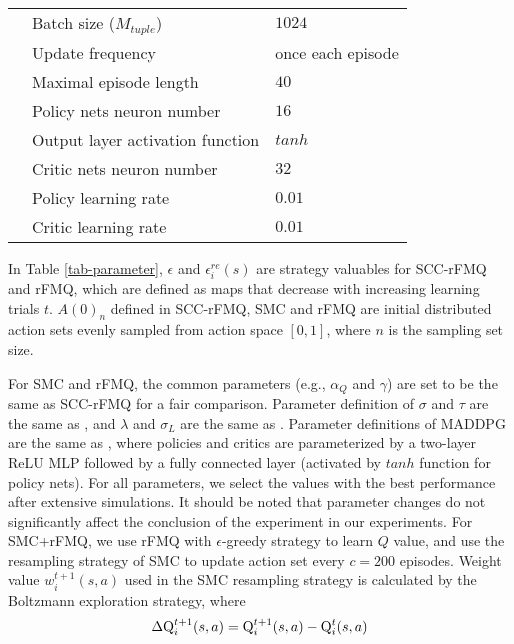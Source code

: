 \documentclass[journal,transmag]{IEEEtran}
\begin{document}
\begin{table}[h!]
\begin{tabular}{l|l|l}
                        &  Batch size ($M_{tuple}$)              &  $1024$    \\
                        &  Update frequency                     &  once each episode \\
                        &  Maximal episode length                &  $40$       \\
                        &  Policy nets neuron number             &  $16$       \\
                        &  Output layer activation function      &  $tanh$       \\
                        &  Critic nets neuron number             &  $32$       \\
                        &  Policy learning rate                  &  $0.01$       \\
                        &  Critic learning rate                  &  $0.01$       \\
\hline
\hline
\end{tabular}
\end{table}

In Table \ref{tab-parameter}, $\epsilon$ and $\epsilon_i^{re}(s)$ are strategy valuables for SCC-rFMQ and rFMQ, which are defined as maps that decrease with increasing learning trials $t$. $A(0)_n$  defined in SCC-rFMQ, SMC and rFMQ are initial distributed action sets evenly sampled from action space $[0,1]$, where $n$ is the sampling set size.

For SMC and rFMQ, the common parameters (e.g., $\alpha_Q$ and $\gamma$) are set to be the same as SCC-rFMQ for a fair comparison. Parameter definition of $\sigma$ and $\tau$ are the same as \cite{Lazaric2007Reinforcement}, and $\lambda$ and $\sigma_L $ are the same as \cite{deJong2008AAL}. Parameter definitions of MADDPG are the same as \cite{NIPS2017_7217}, where policies and critics are parameterized by a two-layer ReLU MLP followed by a fully connected layer (activated by $tanh$ function for policy nets). For all parameters, we select the values with the best performance after extensive simulations. It should be noted that parameter changes do not significantly affect the conclusion of the experiment in our experiments. For SMC+rFMQ, we use rFMQ with $\epsilon$-greedy strategy to learn $Q$ value, and use the resampling strategy of SMC to update action set every $c=200$ episodes. Weight value $w_{i}^{t+1}(s,a)$ used in the SMC resampling strategy is calculated by the Boltzmann exploration strategy, where
\[\Delta {\rm{Q}}_i^{t + 1}(s,a) = {\rm{Q}}_i^{t + 1}(s,a) - {\rm{Q}}_i^t(s,a)\]
\end{document}
